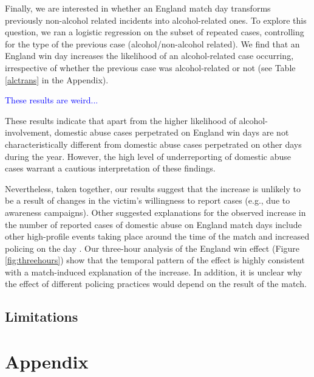 \documentclass[12pt, letterpaper]{article}
\newcommand{\AT}[1] {{\textcolor{blue}{#1}}}
\begin{document}
Finally, we are interested in whether an England match day transforms previously non-alcohol related incidents into alcohol-related ones. To explore this question, we ran a logistic regression on the subset of repeated cases, controlling for the type of the previous case (alcohol/non-alcohol related). We find that an England win day increases the likelihood of an alcohol-related case occurring, irrespective of whether the previous case was alcohol-related or not (see Table \ref{alctrans} in the Appendix).

\AT{These results are weird...}

These results indicate that apart from the higher likelihood of alcohol-involvement, domestic abuse cases perpetrated on England win days are not characteristically different from domestic abuse cases perpetrated on other days during the year. However, the high level of underreporting of domestic abuse cases warrant a cautious interpretation of these findings. 

 Nevertheless, taken together, our results suggest that the increase is unlikely to be a result of changes in the victim's willingness to report cases (e.g., due to awareness campaigns). Other suggested explanations for the observed increase in the number of reported cases of domestic abuse on England match days include other high-profile events taking place around the time of the match and increased policing on the day \autocite{Brooks-Hay2018}. Our three-hour analysis of the England win effect (Figure \ref{fig:threehours}) show that the temporal pattern of the effect is highly consistent with a match-induced explanation of the increase. In addition, it is unclear why the effect of different policing practices would depend on the result of the match. 


\subsection{Limitations}



\newpage

\section*{Appendix}
\end{document}
